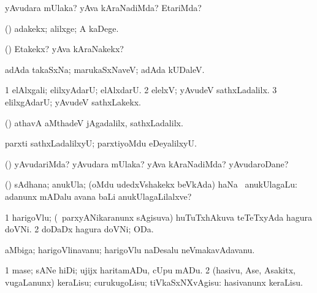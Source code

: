 \bentry
{} 
\gl{\kirxvi}
\expl{}
\bmng
yAvudara mUlaka? yAva kAraNadiMda? EtariMda? 
\emng
\eentry

\bentry
{} 
\gl{\saMavayx}
\expl{}
\bmng
(\aupa) adakekx; alilxge; A kaDege. 
\emng
\eentry

\bentry
{} 
\gl{\kirxvi}
\expl{}
\bmng
(\aupa) Etakekx? yAva kAraNakekx? 
\emng
\eentry

\bentry
{} 
\gl{\saMavayx}
\expl{}
\bmng
adAda takaSxNa; marukaSxNaveV; adAda kUDaleV. 
\emng
\eentry

\bentry
{} 
\gl{\kirxvi}
\expl{}
\bmng
\bnum
\num{1} elAlxgali; elilxyAdarU; elAlxdarU. 
\num{2} elelxV; yAvudeV sathxLadalilx. 
\num{3} elilxgAdarU; yAvudeV sathxLakekx. 
\enum
\emng

\noindent 
\gl{\pagu}
\expl{}
\bmng
{} (\AmA) athavA aMthadeV jAgadalilx, sathxLadalilx. 
\emng
\eentry

\bentry
{}
\gl{\saMavayx}
\expl{}
\bmng
parxti sathxLadalilxyU; parxtiyoMdu eDeyalilxyU. 
\emng
\eentry

\bentry
{} 
\gl{\kirxvi}
\expl{}
\bmng
(\pArxparx) yAvudariMda? yAvudara mUlaka? yAva kAraNadiMda? yAvudaroDane? 
\emng
\eentry

\bentry
{} 
\gl{\nA}
\expl{}
\bmng
(\AmA) sAdhana; anukUla; (oMdu udedxVshakekx beVkAda) haNa \mo\ anukUlagaLu:  adanunx mADalu avana baLi anukUlagaLilalxve? 
\emng
\eentry

\bentry
{} 
\gl{\nA}
\bmng
\bnum
\num{1} harigoVlu; (\sA\ parxyANikaranunx sAgisuva) huTuTxhAkuva teTeTxyAda hagura doVNi. 
\num{2} doDaDx hagura doVNi; ODa. 
\enum
\emng
\eentry

\bentry
{} 
\gl{\nA}
\bmng
aMbiga; harigoVlinavanu; harigoVlu naDesalu neVmakavAdavanu. 
\emng
\eentry

\bentry
{} 
\gl{\sakirx}
\bmng
\bnum
\num{1} mase; sANe hiDi; ujijx haritamADu, cUpu mADu. 
\num{2} (hasivu, Ase, Asakitx, \mo vugaLanunx) keraLisu; curukugoLisu; tiVkaSxNXvAgisu:  hasivanunx keraLisu. 
\enum
\emng
\eentry

